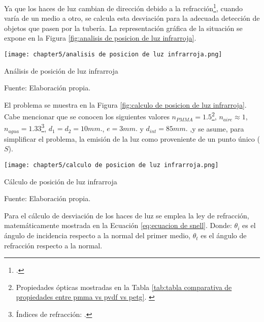
Ya que los haces de luz cambian de dirección debido a la refracción\footnote{\cite{Hecht2017}.}, cuando varía de un medio a otro, se calcula esta desviación para la adecuada detección de objetos que pasen por la tubería. La representación gráfica de la situación se expone en la Figura \ref{fig:analisis de posicion de luz infrarroja}.

\begin{myfigure}[H]
	\footnotesize\centering
	\texttt{[image: chapter5/analisis de posicion de luz infrarroja.png]}
	\caption{Análisis de posición de luz infrarroja}
	\begin{myflushcenter}
		Fuente: Elaboración propia.
	\end{myflushcenter}
	\label{fig:analisis de posicion de luz infrarroja}
\end{myfigure}

El problema se muestra en la Figura \ref{fig:calculo de posicion de luz infrarroja}. Cabe mencionar que se conocen los siguientes valores $n_{PMMA}=1.5$\footnote{Propiedades ópticas mostradas en la Tabla \ref{tab:tabla comparativa de propiedades entre pmma vs pvdf vs petg}. \cite{Berins1991}}, $n_{aire}\approx1$, $n_{agua}=1.33$\footnote{Índices de refracción: \cite{Hecht2017}.}, $d_{1}=d_{2}=10 mm.$, $e=3 mm.$ y $d_{int}=85 mm.$ ,y se asume, para simplificar el problema, la emisión de la luz como proveniente de un punto único ($S$).

\begin{myfigure}[H]
	\footnotesize\centering
	\texttt{[image: chapter5/calculo de posicion de luz infrarroja.png]}
	\caption{Cálculo de posición de luz infrarroja}
	\begin{myflushcenter}
		Fuente: Elaboración propia.
	\end{myflushcenter}
	\label{fig:calculo de posicion de luz infrarroja}
\end{myfigure}

Para el cálculo de desviación de los haces de luz se emplea la ley de refracción, matemáticamente mostrada en la Ecuación \ref{eq:ecuacion de snell}. Donde: $\theta_{i}$ es el ángulo de incidencia respecto a la normal del primer medio, $\theta_{t}$ es el ángulo de refracción respecto a la normal.

